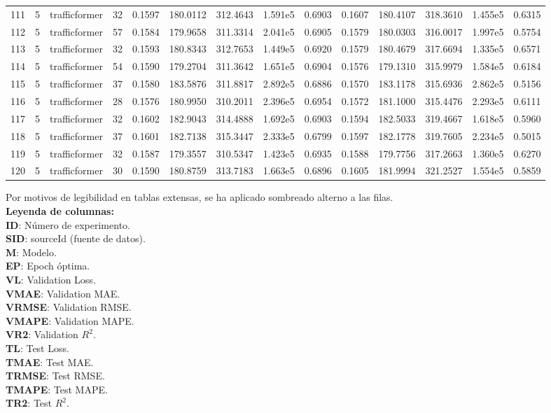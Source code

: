 \begin{landscape}
\begin{longtable}{c c c c c c c c c c c c c c}
	111 & 5 & trafficformer & 32 & 0.1597 & 180.0112 & 312.4643 & 1.591e5 & 0.6903 & 0.1607 & 180.4107 & 318.3610 & 1.455e5 & 0.6315 \\
	112 & 5 & trafficformer & 57 & 0.1584 & 179.9658 & 311.3314 & 2.041e5 & 0.6905 & 0.1579 & 180.0303 & 316.0017 & 1.997e5 & 0.5754 \\
	113 & 5 & trafficformer & 32 & 0.1593 & 180.8343 & 312.7653 & 1.449e5 & 0.6920 & 0.1579 & 180.4679 & 317.6694 & 1.335e5 & 0.6571 \\
	114 & 5 & trafficformer & 54 & 0.1590 & 179.2704 & 311.3642 & 1.651e5 & 0.6904 & 0.1576 & 179.1310 & 315.9979 & 1.584e5 & 0.6184 \\
	115 & 5 & trafficformer & 37 & 0.1580 & 183.5876 & 311.8817 & 2.892e5 & 0.6886 & 0.1570 & 183.1178 & 315.6936 & 2.862e5 & 0.5156 \\
	116 & 5 & trafficformer & 28 & 0.1576 & 180.9950 & 310.2011 & 2.396e5 & 0.6954 & 0.1572 & 181.1000 & 315.4476 & 2.293e5 & 0.6111 \\
	117 & 5 & trafficformer & 32 & 0.1602 & 182.9043 & 314.4888 & 1.692e5 & 0.6903 & 0.1594 & 182.5033 & 319.4667 & 1.618e5 & 0.5960 \\
	118 & 5 & trafficformer & 37 & 0.1601 & 182.7138 & 315.3447 & 2.333e5 & 0.6799 & 0.1597 & 182.1778 & 319.7605 & 2.234e5 & 0.5015 \\
	119 & 5 & trafficformer & 32 & 0.1587 & 179.3557 & 310.5347 & 1.423e5 & 0.6935 & 0.1588 & 179.7756 & 317.2663 & 1.360e5 & 0.6270 \\
	120 & 5 & trafficformer & 30 & 0.1590 & 180.8759 & 313.7183 & 1.663e5 & 0.6896 & 0.1605 & 181.9994 & 321.2527 & 1.554e5 & 0.5859 \\
\end{longtable}
	
\vspace{0.5em}
\begin{minipage}{0.99\textwidth}
\footnotesize
Por motivos de legibilidad en tablas extensas, se ha aplicado sombreado alterno a las filas.
\\[0.4em]
\textbf{Leyenda de columnas:} \\
\textbf{ID}: Número de experimento. \\
\textbf{SID}: sourceId (fuente de datos). \\
\textbf{M}: Modelo. \\
\textbf{EP}: Epoch óptima. \\
\textbf{VL}: Validation Loss. \\
\textbf{VMAE}: Validation MAE. \\
\textbf{VRMSE}: Validation RMSE. \\
\textbf{VMAPE}: Validation MAPE. \\
\textbf{VR2}: Validation $R^2$. \\
\textbf{TL}: Test Loss. \\
\textbf{TMAE}: Test MAE. \\
\textbf{TRMSE}: Test RMSE. \\
\textbf{TMAPE}: Test MAPE. \\
\textbf{TR2}: Test $R^2$.\\
\end{minipage}

\end{landscape}


